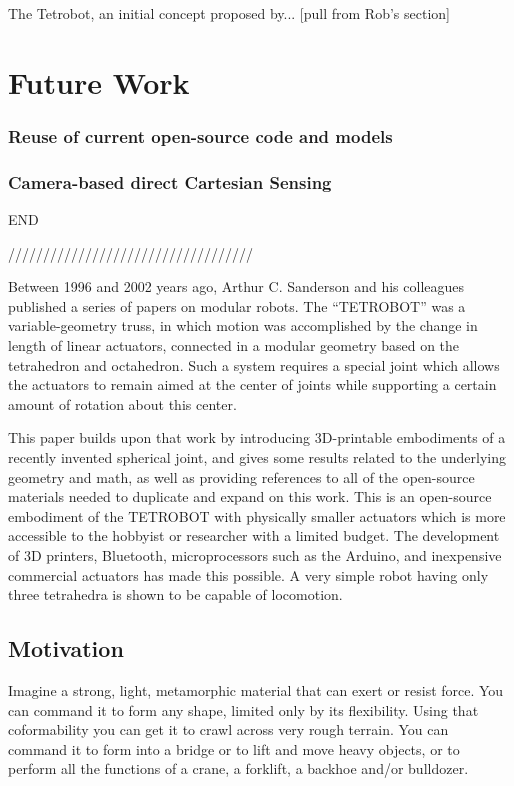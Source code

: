 \documentclass[11pt]{article}
\begin{document}
The Tetrobot, an initial concept proposed by... [pull from Rob's section] 
\section{Future Work}
\subsubsection{Reuse of current open-source code and models}
\subsubsection{Camera-based direct Cartesian Sensing}

END

///////////////////////////////////







Between 1996 and 2002 years ago, Arthur C. Sanderson and his colleagues published a series of
papers\cite{sanderson1996modular,lee2002dynamic,lee1999dynamics} on modular robots.
The ``TETROBOT'' was a variable-geometry truss, in which motion was accomplished by the change
in length of linear actuators, connected in a modular geometry based on the tetrahedron and octahedron.  Such a system
requires a special joint which allows the actuators to remain aimed at the center of joints while supporting
a certain amount of rotation about this center.


This paper builds upon that work by
introducing 3D-printable embodiments of
a recently invented spherical joint\cite{song2003spherical},
and gives some results related to the underlying geometry and math, as well as providing
references to all of the open-source materials needed to duplicate and expand on this work. This is an
open-source embodiment of the TETROBOT with physically smaller actuators which is more accessible to the
hobbyist or researcher with a limited budget.  The development of 3D printers, Bluetooth, microprocessors
such as the Arduino, and inexpensive commercial actuators has made this possible.
A very simple robot having only three tetrahedra is shown to be capable of locomotion.

\subsection{Motivation}

Imagine a strong, light, metamorphic material that can exert or resist force.
You can command it to form any shape, limited only by its flexibility.
Using that coformability you can get it to crawl across very rough terrain.
You can command it to form into a bridge or to lift and move heavy objects,
or to perform all the functions of a crane, a forklift, a backhoe and/or bulldozer.
\end{document}
